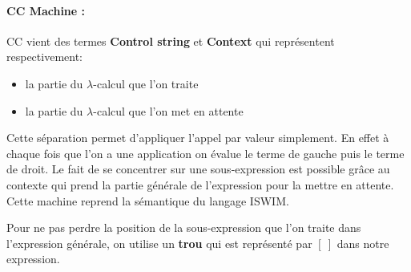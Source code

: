\documentclass[10pt,a4paper]{report}
\begin{document}
	\paragraph{CC Machine :} CC vient des termes \textbf{Control string} et \textbf{Context} qui représentent respectivement:
	\begin{itemize}
		\item la partie du $\lambda$-calcul que l'on traite
		\item la partie du $\lambda$-calcul que l'on met en attente 
	\end{itemize}
	Cette séparation permet d'appliquer l'appel par valeur simplement. En effet à chaque fois que l'on a une application on évalue le terme de gauche puis le terme de droit. Le fait de se concentrer sur une sous-expression est possible grâce au contexte qui prend la partie générale de l'expression pour la mettre en attente. Cette machine reprend la sémantique du langage ISWIM. 
	\medbreak
	
	Pour ne pas perdre la position de la sous-expression que l'on traite dans l'expression générale, on utilise un \textbf{trou} qui est représenté par $[~]$ dans notre expression.
	\bigbreak
	
\end{document}
